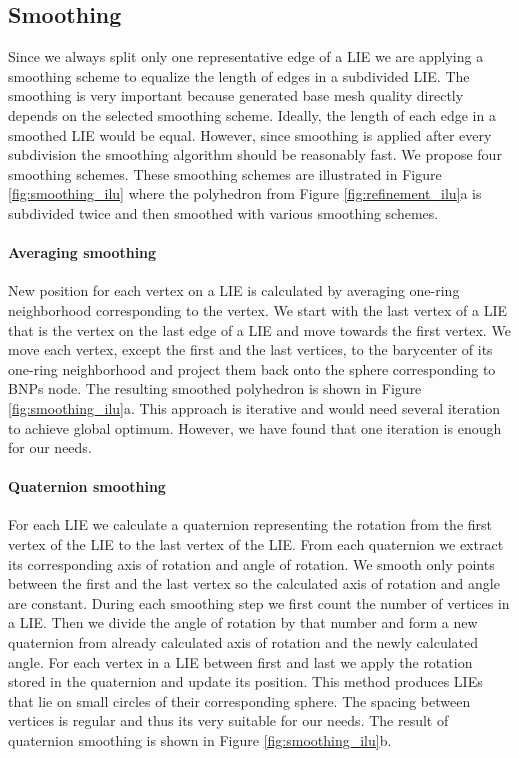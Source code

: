 \subsection{Smoothing}
Since we always split only one representative edge of a LIE we are applying a smoothing scheme to equalize the length of edges in a subdivided LIE. The smoothing is very important because generated base mesh quality directly depends on the selected smoothing scheme. Ideally, the length of each edge in a smoothed LIE would be equal. However, since smoothing is applied after every subdivision the smoothing algorithm should be reasonably fast. We propose four smoothing schemes. These smoothing schemes are illustrated in Figure \ref{fig:smoothing_ilu} where the polyhedron from Figure \ref{fig:refinement_ilu}a is subdivided twice and then smoothed with various smoothing schemes.

\paragraph{Averaging smoothing}
New position for each vertex on a LIE is calculated by averaging one-ring neighborhood corresponding to the vertex. We start with the last vertex of a LIE that is the vertex on the last edge of a LIE and move towards the first vertex. We move each vertex, except the first and the last vertices, to the barycenter of its one-ring neighborhood and project them back onto the sphere corresponding to BNPs node. The resulting smoothed polyhedron is shown in Figure \ref{fig:smoothing_ilu}a. This approach is iterative and would need several iteration to achieve global optimum. However, we have found that one iteration is enough for our needs.

\paragraph{Quaternion smoothing}
For each LIE we calculate a quaternion representing the rotation from the first vertex of the LIE to the last vertex of the LIE. From each quaternion we extract its corresponding axis of rotation and angle of rotation. We smooth only points between the first and the last vertex so the calculated axis of rotation and angle are constant. During each smoothing step we first count the number of vertices in a LIE. Then we divide the angle of rotation by that number and form a new quaternion from already calculated axis of rotation and the newly calculated angle. For each vertex in a LIE between first and last we apply the rotation stored in the quaternion and update its position. This method produces LIEs that lie on small circles of their corresponding sphere. The spacing between vertices is regular and thus its very suitable for our needs. The result of quaternion smoothing is shown in Figure \ref{fig:smoothing_ilu}b.

